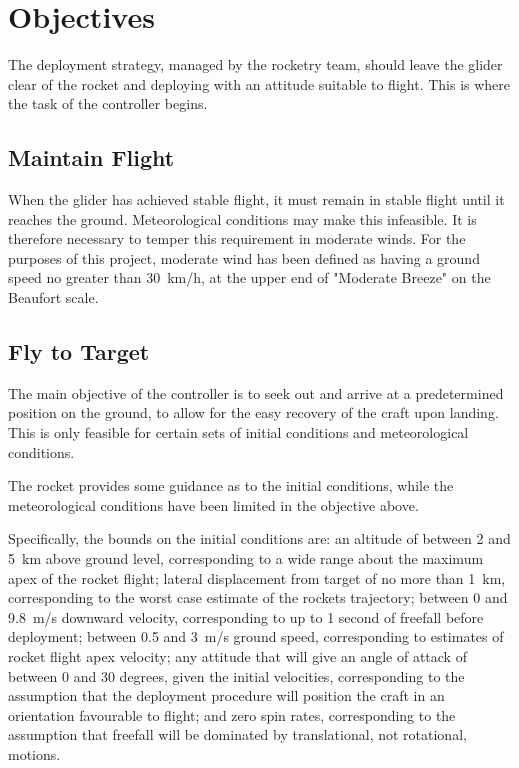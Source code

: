 \documentclass{sydeStyle}
\begin{document}
\chapter{Objectives}

The deployment strategy, managed by the rocketry team, should leave the glider
clear of the rocket and deploying with an attitude suitable to flight. This is
where the task of the controller begins.

\section{Maintain Flight}

When the glider has achieved stable flight, it must remain in stable flight
until it reaches the ground. Meteorological conditions may make this infeasible.
It is therefore necessary to temper this requirement in moderate winds. For the
purposes of this project, moderate wind has been defined as having a ground
speed no greater than 30~km/h, at the upper end of "Moderate Breeze" on the
Beaufort scale\cite{wiki:beaufort}.

\section{Fly to Target}

The main objective of the controller is to seek out and arrive at a
predetermined position on the ground, to allow for the easy recovery of the
craft upon landing. This is only feasible for certain sets of initial conditions
and meteorological conditions.

The rocket provides some guidance as to the initial conditions, while the
meteorological conditions have been limited in the objective above.

Specifically, the bounds on the initial conditions are: an altitude of between
2 and 5~km above ground level, corresponding to a wide range about the maximum
apex of the rocket flight; lateral displacement from target of no more than
1~km, corresponding to the worst case estimate of the rockets trajectory;
between 0 and 9.8~m/s downward velocity, corresponding to up to 1 second of
freefall before deployment; between 0.5 and 3~m/s ground speed, corresponding
to estimates of rocket flight apex velocity; any attitude that will give an
angle of attack of between 0 and 30 degrees, given the initial velocities,
corresponding to the assumption that the deployment procedure will position the
craft in an orientation favourable to flight; and zero spin rates,
corresponding to the assumption that freefall will be dominated by
translational, not rotational, motions.
\end{document}
